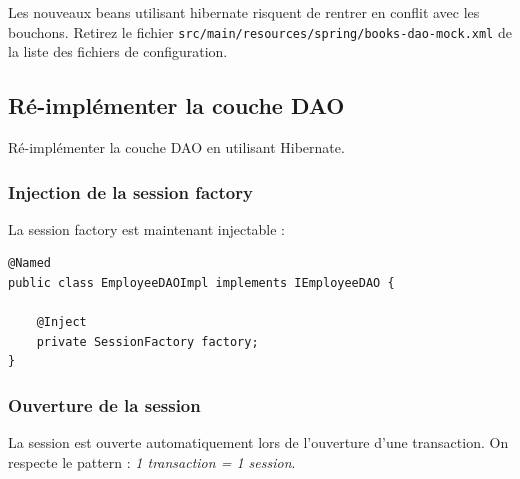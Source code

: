 \documentclass[small,algo]{dushClass}
\begin{document}
Les nouveaux beans utilisant hibernate risquent de rentrer en conflit avec les bouchons. Retirez le fichier \texttt{src/main/resources/spring/books-dao-mock.xml} de la liste des fichiers de configuration.

\subsection{Ré-implémenter la couche DAO}

Ré-implémenter la couche DAO en utilisant Hibernate.



\subsubsection{Injection de la session factory}

La session factory est maintenant injectable :
\begin{lstlisting}
@Named
public class EmployeeDAOImpl implements IEmployeeDAO {
	
	@Inject
	private SessionFactory factory;
}
\end{lstlisting}


\subsubsection{Ouverture de la session}
La session est ouverte automatiquement lors de l'ouverture d'une transaction. On respecte le pattern : \emph{1 transaction = 1 session}.\\

\end{document}
